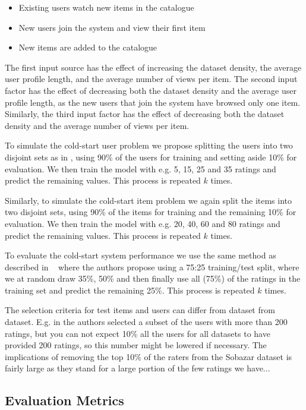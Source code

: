 \begin{itemize}
	\item Existing users watch new items in the catalogue
	\item	New users join the system and view their first item
	\item	New items are added to the catalogue
\end{itemize}

The first input source has the effect of increasing the dataset density, the average user profile length, and the 
average number of views per item. The second input factor has the effect of decreasing both the dataset density 
and the average user profile length, as the new users that join the system have browsed only one item. Similarly, 
the third input factor has the effect of decreasing both the dataset density and the average number of views per 
item.

To simulate the cold-start user problem we propose splitting the users into two disjoint sets as in \cite{Stern2009, Lam2008}, 
using 90\% of the users for training and setting aside 10\% for evaluation. We then train the model with e.g. 5, 15, 25 and 35 
ratings and predict the remaining values. This process is repeated $k$ times.

Similarly, to simulate the cold-start item problem we again split the items into two disjoint sets,
 using 90\% of the items for training and the remaining 10\% for evaluation.  We then train the model 
 with e.g. 20, 40, 60 and 80 ratings and predict the remaining values. This process is repeated $k$ times.

To evaluate the cold-start system performance we use the same method as described in ~\cite{Agarwal2009}
where the authors propose using a 75:25 training/test split, where we at random draw 35\%, 50\% 
and then finally use all (75\%) of the ratings in the training set and predict the remaining 25\%. This process is repeated $k$ times.

The selection criteria for test items and users can differ from dataset from dataset. E.g. in \cite{Rashid2002, Rashid2008}
the authors selected a subset of the users with more than 200 ratings, but you can not expect 10\% all the users for all datasets
to have provided 200 ratings, so this number might be lowered if necessary. The implications of removing the top 10\% of 
the raters from the Sobazar dataset is fairly large as they stand for a large portion of the few ratings we have...



\subsection{Evaluation Metrics}





